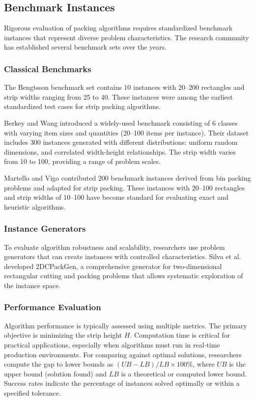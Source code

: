 \documentclass[11pt,a4paper]{article}
\begin{document}
\subsection{Benchmark Instances}

Rigorous evaluation of packing algorithms requires standardized benchmark instances that represent diverse problem characteristics. The research community has established several benchmark sets over the years.

\subsubsection{Classical Benchmarks}

The Bengtsson \cite{bengtsson1982} benchmark set contains 10 instances with 20--200 rectangles and strip widths ranging from 25 to 40. These instances were among the earliest standardized test cases for strip packing algorithms.

Berkey and Wang \cite{berkey1987} introduced a widely-used benchmark consisting of 6 classes with varying item sizes and quantities (20--100 items per instance). Their dataset includes 300 instances generated with different distributions: uniform random dimensions, and correlated width-height relationships. The strip width varies from 10 to 100, providing a range of problem scales.

Martello and Vigo \cite{martello1998} contributed 200 benchmark instances derived from bin packing problems and adapted for strip packing. These instances with 20--100 rectangles and strip widths of 10--100 have become standard for evaluating exact and heuristic algorithms.

\subsubsection{Instance Generators}

To evaluate algorithm robustness and scalability, researchers use problem generators that can create instances with controlled characteristics. Silva et al. \cite{silva2014} developed 2DCPackGen, a comprehensive generator for two-dimensional rectangular cutting and packing problems that allows systematic exploration of the instance space.

\subsubsection{Performance Evaluation}

Algorithm performance is typically assessed using multiple metrics. The primary objective is minimizing the strip height $H$. Computation time is critical for practical applications, especially when algorithms must run in real-time production environments. For comparing against optimal solutions, researchers compute the gap to lower bounds as $(UB - LB) / LB \times 100\%$, where $UB$ is the upper bound (solution found) and $LB$ is a theoretical or computed lower bound. Success rates indicate the percentage of instances solved optimally or within a specified tolerance.
\end{document}
